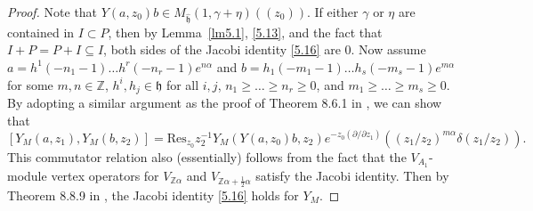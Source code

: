 \documentclass[12pt,a4paper,reqno]{amsart}
\numberwithin{equation}{section}
\numberwithin{equation}{section}
\theoremstyle{definition}
\newcommand{\N}{\mathbb{N}}
\newcommand{\Z}{\mathbb{Z}}
\def\la{\lambda}
\def \al{\alpha}
\def \ga {\gamma}
\def \ssq{\subseteq}
\def \h {\mathfrak{h}}
\def\Res{\mathrm{Res}}
\def\ds{\dots}
\begin{document}
\begin{proof}
		Note that $Y(a,z_0)b\in M_{\hat{\h}}(1,\ga+\eta)((z_0))$. If either $\ga$ or $\eta$ are contained in $I\subset P$, then by Lemma~\ref{lm5.1}, \eqref{5.13}, and the fact that $I+P=P+I\ssq I$, both sides of the Jacobi identity \eqref{5.16} are $0$. Now assume $a=h^1(-n_1-1)\ds h^r(-n_r-1)e^{n\al}$ and $b=h_1(-m_1-1)\ds h_s(-m_s-1)e^{m\al}$ for some $m,n\in \Z$, $h^i,h_j\in \h$ for all $i,j$, $n_1\geq \ds\geq n_r\geq 0$, and $m_1\geq \ds\geq m_s\geq 0$. By adopting a similar argument as the proof of Theorem 8.6.1 in \cite{FLM}, we can show that %
		$$[Y_M(a,z_1),Y_M(b,z_2)]=\Res_{z_0} z_2^{-1}Y_M(Y(a,z_0)b,z_2)e^{-z_0(\partial/\partial z_1)}\left((z_1/z_2)^{m\al} \delta(z_1/z_2)\right).$$
		This commutator relation also (essentially) follows from the fact that the $V_{A_1}$-module vertex operators for $V_{\Z\al}$ and $V_{\Z\al+\frac{1}{2}\al}$ satisfy the Jacobi identity. Then by Theorem 8.8.9 in \cite{FLM}, the Jacobi identity \eqref{5.16} holds for $Y_M$. 
	\end{proof}
	
	
\end{document}

